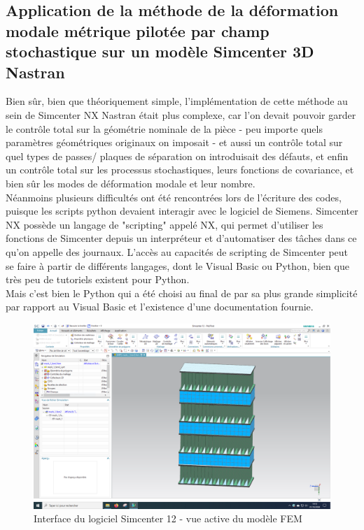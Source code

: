 \documentclass[a4paper,10pt]{article}
\begin{document}
\subsection{Application de la méthode de la déformation modale métrique pilotée par champ stochastique sur un modèle Simcenter 3D Nastran}

Bien sûr, bien que théoriquement simple, l'implémentation de cette méthode au sein de Simcenter NX Nastran était plus complexe, car l'on devait pouvoir garder le contrôle total sur la géométrie nominale de la pièce - peu importe quels paramètres géométriques originaux on imposait - et aussi un contrôle total sur quel types de passes/ plaques de séparation on introduisait des défauts, et enfin un contrôle total sur les processus stochastiques, leurs fonctions de covariance, et bien sûr les modes de déformation modale et leur nombre.\\

Néanmoins plusieurs difficultés ont été rencontrées lors de l'écriture des codes, puisque les scripts python devaient interagir avec le logiciel de Siemens. Simcenter NX possède un langage de "scripting" appelé NX, qui permet d'utiliser les fonctions de Simcenter depuis un interpréteur et d'automatiser des tâches dans ce qu'on appelle des journaux. L'accès au capacités de scripting de Simcenter peut se faire à partir de différents langages, dont le Visual Basic ou Python, bien que très peu de tutoriels existent pour Python. \\

Mais c'est bien le Python qui a été choisi au final de par sa plus grande simplicité par rapport au Visual Basic et l'existence d'une documentation fournie. \\

\begin{figure}[H]
   \centering   
   \includegraphics[scale=0.18]{SimcenterInterface.PNG}
      \caption{Interface du logiciel Simcenter 12 - vue active du modèle FEM}
         \label{SimcenterInterface}
\end{figure}
\end{document}
